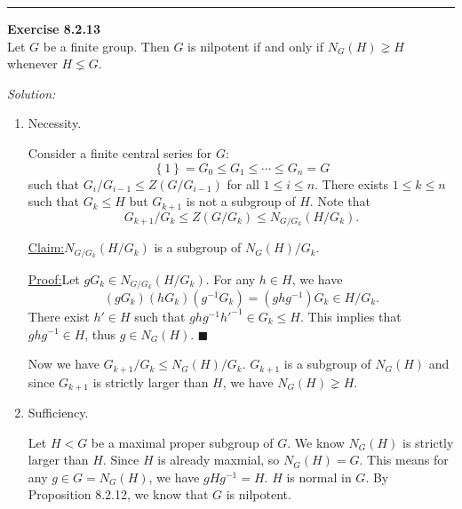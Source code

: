 \documentclass[a4paper, 12pt]{article}
\newenvironment{problem}[2][Exercise]
    { \begin{mdframed}[backgroundcolor=gray!20] \textbf{#1 #2} \\}
    {  \end{mdframed}}
\newenvironment{solution}
    {\textit{Solution:}}
    {}
\newenvironment{claim}[1]{\par\noindent\underline{Claim:}\space#1}{}
\newenvironment{claimproof}[1]{\par\noindent\underline{Proof:}\space#1}{\hfill $\blacksquare$}
\begin{document}
\noindent\rule{7in}{2.8pt}
\begin{problem}{8.2.13}
Let \(G\) be a finite group. Then \(G\) is nilpotent if and only if \(N_G(H)\gneq  H\) whenever \(H\lneq G\).
\end{problem}
\begin{solution}
\begin{enumerate}[(1)]
\item Necessity.

Consider a finite central series for \(G\):
\[\left\{ 1 \right\}=G_0\leq G_1\leq \cdots\leq G_n=G\] 
such that \(G_i/G_{i-1}\leq Z(G/G_{i-1})\) for all \(1\leq i\leq n\). There exists \(1\leq k\leq n\) such that \(G_k\leq H\) but \(G_{k+1}\) is not a subgroup of \(H\). 
Note that 
\[G_{k+1}/G_k\leq Z(G/G_k)\leq N_{G/G_k}(H/G_k).\]

\begin{claim}
\(N_{G/G_k}(H/G_k)\) is a subgroup of \(N_G(H)/G_k\).
\end{claim}
\begin{claimproof}
Let \(gG_k\in N_{G/G_k}(H/G_k)\). For any \(h\in H\), we have 
\[(gG_k)(hG_k)(g^{-1}G_k)=(ghg^{-1})G_k\in H/G_k.\]
There exist \(h'\in H\) such that \(ghg^{-1}h'^{-1}\in G_k\leq H\). This implies that \(ghg^{-1}\in H\), thus \(g\in N_G(H)\).
\end{claimproof}

Now we have \(G_{k+1}/G_k\leq N_G(H)/G_k\). \(G_{k+1}\) is a subgroup of \(N_G(H)\) and since \(G_{k+1}\) is strictly larger than \(H\), we have \(N_G(H)\gneq H\). 
\item Sufficiency. 

Let \(H<G\) be a maximal proper subgroup of \(G\). We know \(N_G(H)\) is strictly larger than \(H\). Since \(H\) is already maxmial, so \(N_G(H)=G\). This means for any \(g\in G=N_G(H)\), we have \(gHg^{-1}=H\). \(H\) is normal 
in \(G\). By Proposition 8.2.12, we know that \(G\) is nilpotent.
\end{enumerate}
\end{solution}
\end{document}
